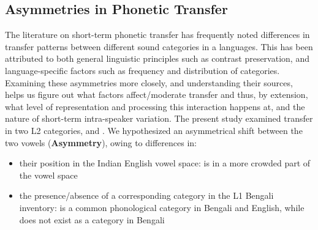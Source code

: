\documentclass[12 pt]{article}
\newcommand{\nt}[1]{\textipa{[#1]}} %
\begin{document}
\subsection{Asymmetries in Phonetic Transfer}
The literature on short-term phonetic transfer has frequently noted differences in transfer patterns between different sound categories in a languages. This has been attributed to both general linguistic principles such as contrast preservation, and language-specific factors such as frequency and distribution of categories. Examining these asymmetries more closely, and understanding their sources, helps us figure out what factors affect/moderate transfer and thus, by extension, what level of representation and processing this interaction happens at, and the nature of short-term intra-speaker variation. 
The present study examined transfer in two L2 categories, \nt{2} and \nt{\ae}. We hypothesized an asymmetrical shift between the two vowels (\textbf{Asymmetry}), owing to differences in:
 \begin{itemize}
 	\item their position in the Indian English vowel space: \nt{\ae} is in a more crowded part of the vowel space
 	\item the presence/absence of a corresponding category in the L1 Bengali inventory: \nt{\ae} is a common phonological category in Bengali and English, while \nt{2} does not exist as a category in Bengali
 \end{itemize}
\end{document}

